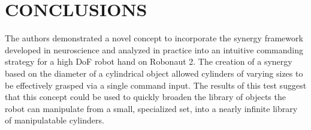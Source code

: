 \documentclass[runningheads,a4paper]{llncs}
\begin{document}


 
\section{CONCLUSIONS}

The authors demonstrated a novel concept to incorporate the synergy framework developed in neuroscience and analyzed in practice  into an intuitive commanding strategy for a high DoF robot hand on Robonaut 2. The creation of a synergy based on the diameter of a cylindrical object allowed cylinders of varying sizes to be effectively grasped via a single command input. The results of this test suggest that this concept could be used to quickly broaden the library of objects the robot can manipulate from a small, specialized set, into a nearly infinite library of manipulatable cylinders. 




\end{document}
